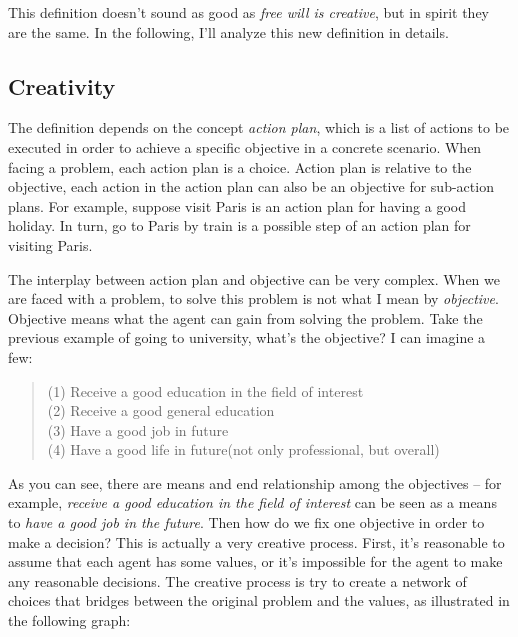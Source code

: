 This definition doesn't sound as good as \emph{free will is creative}, but in spirit they are the same. In the following, I'll analyze this new definition in details.

\subsection{Creativity}

The definition depends on the concept \emph{action plan}, which is a list of actions to be executed in order to achieve a specific objective in a concrete scenario. When facing a problem, each action plan is a choice. Action plan is relative to the objective, each action in the action plan can also be an objective for sub-action plans. For example, suppose visit Paris is an action plan for having a good holiday. In turn, go to Paris by train is a possible step of an action plan for visiting Paris.

The interplay between action plan and objective can be very complex. When we are faced with a problem, to solve this problem is not what I mean by \emph{objective}. Objective means what the agent can gain from solving the problem. Take the previous example of going to university, what's the objective? I can imagine a few:

\begin{quote}
(1) Receive a good education in the field of interest \\
(2) Receive a good general education \\
(3) Have a good job in future \\
(4) Have a good life in future(not only professional, but overall)
\end{quote}

As you can see, there are means and end relationship among the objectives -- for example, \emph{receive a good education in the field of interest} can be seen as a means to \emph{have a good job in the future}. Then how do we fix one objective in order to make a decision? This is actually a very creative process. First, it's reasonable to assume that each agent has some values, or it's impossible for the agent to make any reasonable decisions. The creative process is try to create a network of choices that bridges between the original problem and the values, as illustrated in the following graph:

